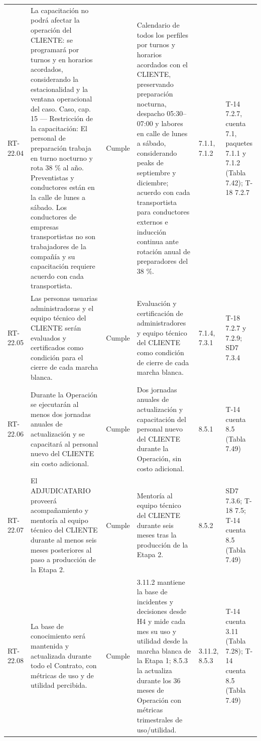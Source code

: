 \documentclass[carta,firma,final]{lafrox}
\begin{document}
\begin{landscape}
{\begin{longtable}{@{}F{0.070} F{0.255} F{0.075} F{0.280} F{0.090} F{0.230}@{}}
  RT-22.04 & La capacitación no podrá afectar la operación del CLIENTE: se programará por turnos y en horarios acordados, considerando la estacionalidad y la ventana operacional del caso. Caso, cap. 15 — Restricción de la capacitación: El personal de preparación trabaja en turno nocturno y rota 38 \% al año. Preventistas y conductores están en la calle de lunes a sábado. Los conductores de empresas transportistas no son trabajadores de la compañía y su capacitación requiere acuerdo con cada transportista. & Cumple & Calendario de todos los perfiles por turnos y horarios acordados con el CLIENTE, preservando preparación nocturna, despacho 05:30–07:00 y labores en calle de lunes a sábado, considerando peaks de septiembre y diciembre; acuerdo con cada transportista para conductores externos e inducción continua ante rotación anual de preparadores del 38 \%. & 7.1.1, 7.1.2 & T-14 7.2.7, cuenta 7.1, paquetes 7.1.1 y 7.1.2 (Tabla 7.42); T-18 7.2.7 \\
  RT-22.05 & Las personas usuarias administradoras y el equipo técnico del CLIENTE serán evaluados y certificados como condición para el cierre de cada marcha blanca. & Cumple & Evaluación y certificación de administradores y equipo técnico del CLIENTE como condición de cierre de cada marcha blanca. & 7.1.4, 7.3.1 & T-18 7.2.7 y 7.2.9; SD7 7.3.4 \\
  RT-22.06 & Durante la Operación se ejecutarán al menos dos jornadas anuales de actualización y se capacitará al personal nuevo del CLIENTE sin costo adicional. & Cumple & Dos jornadas anuales de actualización y capacitación del personal nuevo del CLIENTE durante la Operación, sin costo adicional. & 8.5.1 & T-14 cuenta 8.5 (Tabla 7.49) \\
  RT-22.07 & El ADJUDICATARIO proveerá acompañamiento y mentoría al equipo técnico del CLIENTE durante al menos seis meses posteriores al paso a producción de la Etapa 2. & Cumple & Mentoría al equipo técnico del CLIENTE durante seis meses tras la producción de la Etapa 2. & 8.5.2 & SD7 7.3.6; T-18 7.5; T-14 cuenta 8.5 (Tabla 7.49) \\
  RT-22.08 & La base de conocimiento será mantenida y actualizada durante todo el Contrato, con métricas de uso y de utilidad percibida. & Cumple & 3.11.2 mantiene la base de incidentes y decisiones desde H4 y mide cada mes su uso y utilidad desde la marcha blanca de la Etapa 1; 8.5.3 la actualiza durante los 36 meses de Operación con métricas trimestrales de uso/utilidad. & 3.11.2, 8.5.3 & T-14 cuenta 3.11 (Tabla 7.28); T-14 cuenta 8.5 (Tabla 7.49) \\

\end{longtable}}
\end{landscape}
\end{document}

